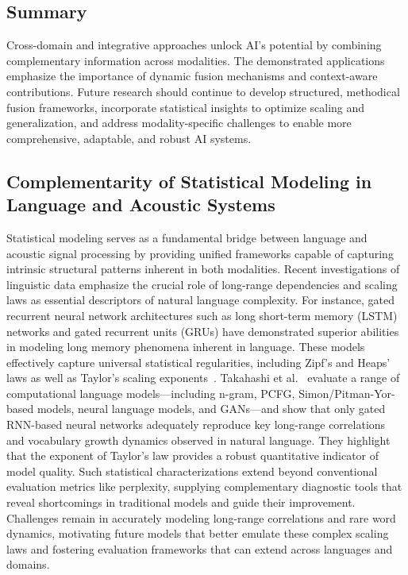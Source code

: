 \documentclass[sigconf]{acmart}
\begin{document}
\subsection{Summary}

Cross-domain and integrative approaches unlock AI’s potential by combining complementary information across modalities. The demonstrated applications emphasize the importance of dynamic fusion mechanisms and context-aware contributions. Future research should continue to develop structured, methodical fusion frameworks, incorporate statistical insights to optimize scaling and generalization, and address modality-specific challenges to enable more comprehensive, adaptable, and robust AI systems.

\subsection{Complementarity of Statistical Modeling in Language and Acoustic Systems}

Statistical modeling serves as a fundamental bridge between language and acoustic signal processing by providing unified frameworks capable of capturing intrinsic structural patterns inherent in both modalities. Recent investigations of linguistic data emphasize the crucial role of long-range dependencies and scaling laws as essential descriptors of natural language complexity. For instance, gated recurrent neural network architectures such as long short-term memory (LSTM) networks and gated recurrent units (GRUs) have demonstrated superior abilities in modeling long memory phenomena inherent in language. These models effectively capture universal statistical regularities, including Zipf’s and Heaps’ laws as well as Taylor’s scaling exponents~\cite{ref51}. Takahashi et al.~\cite{ref51} evaluate a range of computational language models—including n-gram, PCFG, Simon/Pitman-Yor-based models, neural language models, and GANs—and show that only gated RNN-based neural networks adequately reproduce key long-range correlations and vocabulary growth dynamics observed in natural language. They highlight that the exponent of Taylor’s law provides a robust quantitative indicator of model quality. Such statistical characterizations extend beyond conventional evaluation metrics like perplexity, supplying complementary diagnostic tools that reveal shortcomings in traditional models and guide their improvement. Challenges remain in accurately modeling long-range correlations and rare word dynamics, motivating future models that better emulate these complex scaling laws and fostering evaluation frameworks that can extend across languages and domains.
\end{document}
